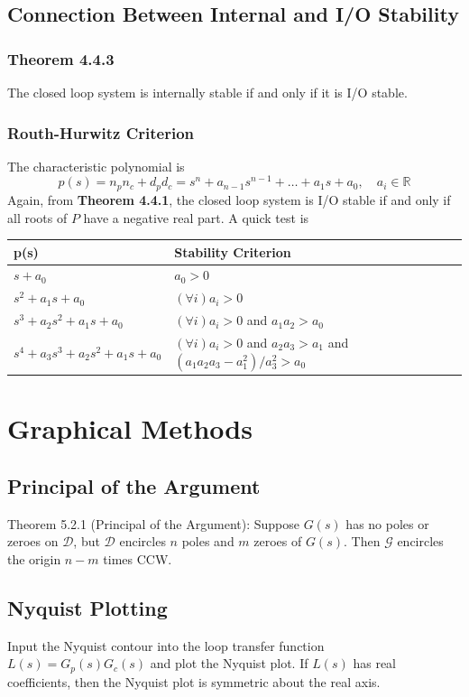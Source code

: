 \documentclass[letterpaper,12pt]{article}
\begin{document}
\subsection{Connection Between Internal and I/O Stability}
\subsubsection{Theorem 4.4.3}
The closed loop system is internally stable if and only if it is I/O stable.
\subsubsection{Routh-Hurwitz Criterion}
The characteristic polynomial is
\begin{equation*}
    p(s) = n_p n_c + d_p d_c = s^n + a_{n-1}s^{n-1} + \dots + a_1 s + a_0, \quad a_i \in \mathbb{R}
\end{equation*}
Again, from \textbf{Theorem 4.4.1}, the closed loop system is I/O stable if and only if all roots of $P$ have a negative real part. A quick test
is 
\begin{table}[h]
    \centering
    \begin{tabular}{ll}
        p(s) & Stability Criterion \\
        \hline
        $s + a_0$ & $a_0 > 0$ \\
        $s^2 + a_1 s + a_0$ & $(\forall i) a_i > 0$ \\
        $s^3 + a_2 s^2 + a_1 s + a_0$ & $(\forall i) a_i > 0$ and $a_1 a_2 > a_0$ \\
        $s^4 + a_3 s^3 + a_2 s^2 + a_1 s + a_0$ & $(\forall i) a_i > 0$ and $a_2 a_3 > a_1$ and $(a_1 a_2 a_3 - a_{1}^2)/a_{3}^2 > a_0$
    \end{tabular}
\end{table}

\section{Graphical Methods}
\subsection{Principal of the Argument}
Theorem 5.2.1 (Principal of the Argument): Suppose $G(s)$ has no poles or zeroes on $\mathcal{D}$, but $\mathcal{D}$ encircles 
$n$ poles and $m$ zeroes of $G(s)$. Then $\mathcal{G}$ encircles the origin $n-m$ times CCW.

\subsection{Nyquist Plotting}
Input the Nyquist contour into the loop transfer function $L(s) = G_p(s) G_c(s)$ and plot the Nyquist plot. If $L(s)$ has real coefficients,
then the Nyquist plot is symmetric about the real axis.
\end{document}

